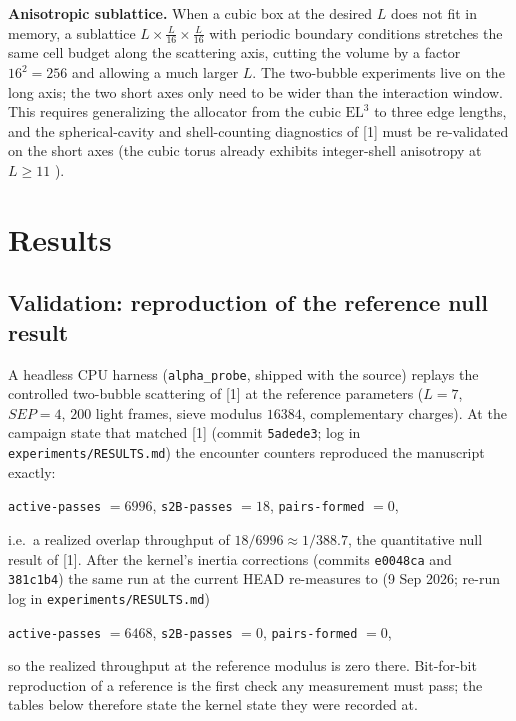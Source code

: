 \documentclass[11pt,a4paper]{article}
\begin{document}
\textbf{Anisotropic sublattice.} When a cubic box at the desired $L$ does not
fit in memory, a sublattice $L \times \frac{L}{16} \times \frac{L}{16}$ with
periodic boundary conditions stretches the same cell budget along the
scattering axis, cutting the volume by a factor $16^2=256$ and allowing a
much larger $L$. The two-bubble experiments live on the long axis; the two
short axes only need to be wider than the interaction window. This requires
generalizing the allocator from the cubic $\mathrm{EL}^3$ to three edge
lengths, and the spherical-cavity and shell-counting diagnostics of [1] must
be re-validated on the short axes (the cubic torus already exhibits
integer-shell anisotropy at $L\ge11$ \cite{itfrombit}).

\section{Results}
\label{sec:results}

\subsection{Validation: reproduction of the reference null result}

A headless CPU harness (\texttt{alpha\_probe}, shipped with the source)
replays the controlled two-bubble scattering of [1] at the reference
parameters ($L=7$, $SEP=4$, $200$ light frames, sieve modulus $16384$,
complementary charges).  At the campaign state that matched [1] (commit
\texttt{5adede3}; log in \texttt{experiments/RESULTS.md}) the encounter
counters reproduced the manuscript exactly:
\begin{center}
  \texttt{active-passes} $= 6996$, \quad \texttt{s2B-passes} $= 18$, \quad
  \texttt{pairs-formed} $= 0$,
\end{center}
i.e.\ a realized overlap throughput of $18/6996 \approx 1/388.7$, the
quantitative null result of [1].  After the kernel's inertia corrections
(commits \texttt{e0048ca} and \texttt{381c1b4}) the same run at the current
HEAD re-measures to (9 Sep 2026; re-run log in
\texttt{experiments/RESULTS.md})
\begin{center}
  \texttt{active-passes} $= 6468$, \quad \texttt{s2B-passes} $= 0$, \quad
  \texttt{pairs-formed} $= 0$,
\end{center}
so the realized throughput at the reference modulus is zero there.
Bit-for-bit reproduction of a reference is the first check any measurement
must pass; the tables below therefore state the kernel state they were
recorded at.
\end{document}
